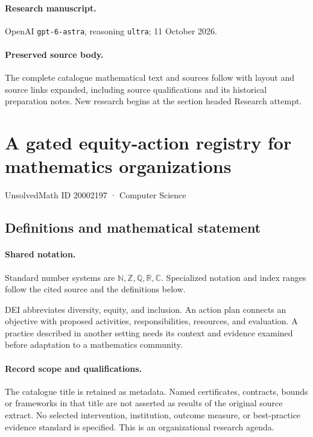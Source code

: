 \documentclass[11pt]{article}
\begin{document}
\paragraph{Research manuscript.} OpenAI \texttt{gpt-6-astra}, reasoning \texttt{ultra}; 11 October 2026.
\paragraph{Preserved source body.} The complete catalogue mathematical text and sources follow with layout and source links expanded, including source qualifications and its historical preparation notes. New research begins at the section headed Research attempt.

\section{A gated equity-action registry for mathematics organizations}\label{20002197}
{\small UnsolvedMath ID 20002197 · Computer Science}
\subsection{Definitions and mathematical statement}

\paragraph{Shared notation.}Standard number systems are $\mathbb N,\mathbb Z,\mathbb Q,\mathbb R,\mathbb C$. Specialized notation and index ranges follow the cited source and the definitions below.


DEI abbreviates diversity, equity, and inclusion. An action plan connects an objective with proposed activities, responsibilities, resources, and evaluation. A practice described in another setting needs its context and evidence examined before adaptation to a mathematics community.
\paragraph{Record scope and qualifications.}
The catalogue title is retained as metadata. Named certificates, contracts, bounds or frameworks in that title are not asserted as results of the original source extract.
No selected intervention, institution, outcome measure, or best-practice evidence standard is specified. This is an organizational research agenda.
\end{document}
